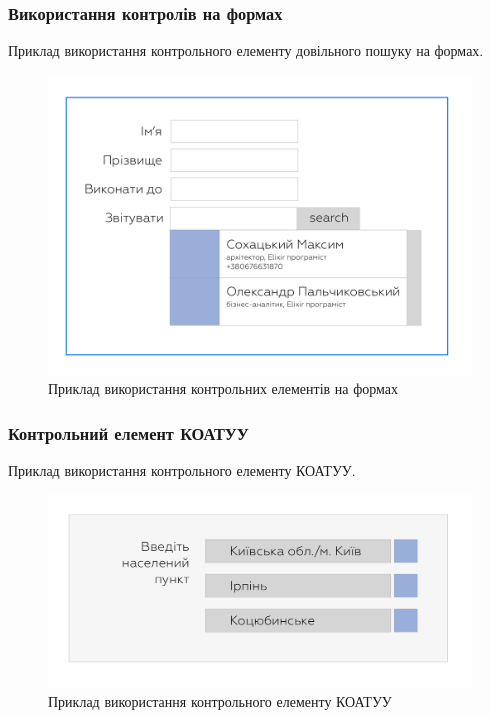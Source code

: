 \newpage
\subsubsection{Використання контролів на формах}

Приклад використання контрольного елементу довільного пошуку на формах.

\begin{figure}[!htbp]
\centerline{\includegraphics[scale=0.3]{comboLookupForm.png}}
\caption{Приклад використання контрольних елементів на формах}
\end{figure}

\subsubsection{Контрольний елемент КОАТУУ}

Приклад використання контрольного елементу КОАТУУ.

\begin{figure}[!htbp]
\centerline{\includegraphics[scale=0.3]{koatuu.png}}
\caption{Приклад використання контрольного елементу КОАТУУ}
\end{figure}

